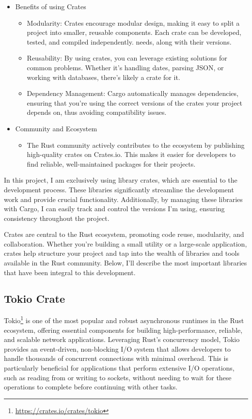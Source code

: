 \begin{itemize}
	\item Benefits of using Crates
	\begin{itemize}
		\item Modularity: Crates encourage modular design, making it easy to split a project into smaller, reusable components. Each crate can be developed, tested, and compiled independently. needs, along with their versions.
		\item Reusability: By using crates, you can leverage existing solutions for common problems. Whether it's handling dates, parsing JSON, or working with databases, there’s likely a crate for it.
		\item Dependency Management: Cargo automatically manages dependencies, ensuring that you’re using the correct versions of the crates your project depends on, thus avoiding compatibility issues.
	\end{itemize}
	
	\item Community and Ecosystem
	\begin{itemize}
		\item The Rust community actively contributes to the ecosystem by publishing high-quality crates on Crates.io. This makes it easier for developers to find reliable, well-maintained packages for their projects.
	\end{itemize}
\end{itemize}

In this project, I am exclusively using library crates, which are essential to the development process. These libraries significantly streamline the development work and provide crucial functionality. Additionally, by managing these libraries with Cargo, I can easily track and control the versions I’m using, ensuring consistency throughout the project.

Crates are central to the Rust ecosystem, promoting code reuse, modularity, and collaboration. Whether you’re building a small utility or a large-scale application, crates help structure your project and tap into the wealth of libraries and tools available in the Rust community. Below, I’ll describe the most important libraries that have been integral to this development.

\subsection{Tokio Crate}

Tokio\footnote{\url{https://crates.io/crates/tokio}} is one of the most popular and robust asynchronous runtimes in the Rust ecosystem, offering essential components for building high-performance, reliable, and scalable network applications. Leveraging Rust’s concurrency model, Tokio provides an event-driven, non-blocking I/O system that allows developers to handle thousands of concurrent connections with minimal overhead. This is particularly beneficial for applications that perform extensive I/O operations, such as reading from or writing to sockets, without needing to wait for these operations to complete before continuing with other tasks.

